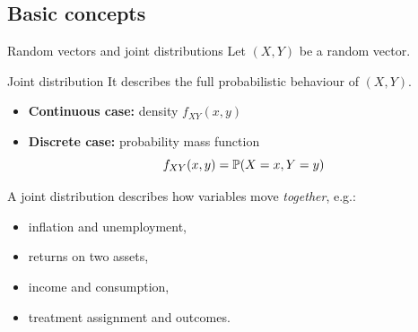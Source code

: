 \documentclass[dvipsnames,aspectratio=169,handout]{beamer}
\begin{document}
\subsection{Basic concepts}

\begin{frame}{Random vectors and joint distributions}
Let $(X,Y)$ be a random vector.

\begin{alertblock}{Joint distribution}
It describes the full probabilistic behaviour of $(X,Y)$.
\begin{itemize}
    \item \textbf{Continuous case:} density $f_{XY}(x,y)$
    \item \textbf{Discrete case:} probability mass function
    \[
    f_{XY}(x,y)=\P(X=x,Y=y)
    \]
\end{itemize}
\end{alertblock}\vspace{-4mm}
\begin{block}{}
\small A joint distribution describes how variables move \emph{together}, e.g.:\\[3mm]
\begin{minipage}{7cm}
\begin{itemize}
    \item inflation and unemployment,\\[-2mm]
    \item returns on two assets,\\[-2mm]
\end{itemize}	
\end{minipage}
\begin{minipage}{7cm}
\begin{itemize}
    \item income and consumption,\\[-2mm]
    \item treatment assignment and outcomes.
\end{itemize}	
\end{minipage}
\end{block}
\end{frame}
\end{document}
